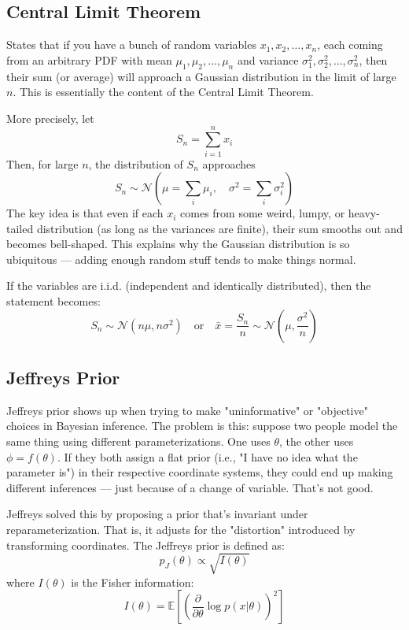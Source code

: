 \subsection{Central Limit Theorem}

States that if you have a bunch of random variables $x_1, x_2, \dots, x_n$, each coming from an arbitrary PDF with mean $\mu_1, \mu_2, \dots, \mu_n$ and variance $\sigma_1^2, \sigma_2^2, \dots, \sigma_n^2$, then their sum (or average) will approach a Gaussian distribution in the limit of large $n$. This is essentially the content of the Central Limit Theorem.

More precisely, let
\[
S_n = \sum_{i=1}^n x_i
\]
Then, for large $n$, the distribution of $S_n$ approaches
\[
S_n \sim \mathcal{N}\left( \mu = \sum_i \mu_i, \quad \sigma^2 = \sum_i \sigma_i^2 \right)
\]
The key idea is that even if each $x_i$ comes from some weird, lumpy, or heavy-tailed distribution (as long as the variances are finite), their sum smooths out and becomes bell-shaped. This explains why the Gaussian distribution is so ubiquitous — adding enough random stuff tends to make things normal.

If the variables are i.i.d. (independent and identically distributed), then the statement becomes:
\[
S_n \sim \mathcal{N}(n\mu, n\sigma^2)
\quad \text{or} \quad
\bar{x} = \frac{S_n}{n} \sim \mathcal{N}(\mu, \frac{\sigma^2}{n})
\]

\subsection{Jeffreys Prior}

Jeffreys prior shows up when trying to make "uninformative" or "objective" choices in Bayesian inference. The problem is this: suppose two people model the same thing using different parameterizations. One uses $\theta$, the other uses $\phi = f(\theta)$. If they both assign a flat prior (i.e., "I have no idea what the parameter is") in their respective coordinate systems, they could end up making different inferences — just because of a change of variable. That's not good.

Jeffreys solved this by proposing a prior that’s invariant under reparameterization. That is, it adjusts for the "distortion" introduced by transforming coordinates. The Jeffreys prior is defined as:
\[
p_J(\theta) \propto \sqrt{I(\theta)}
\]
where $I(\theta)$ is the Fisher information:
\[
I(\theta) = \mathbb{E} \left[ \left( \frac{\partial}{\partial \theta} \log p(x|\theta) \right)^2 \right]
\]

